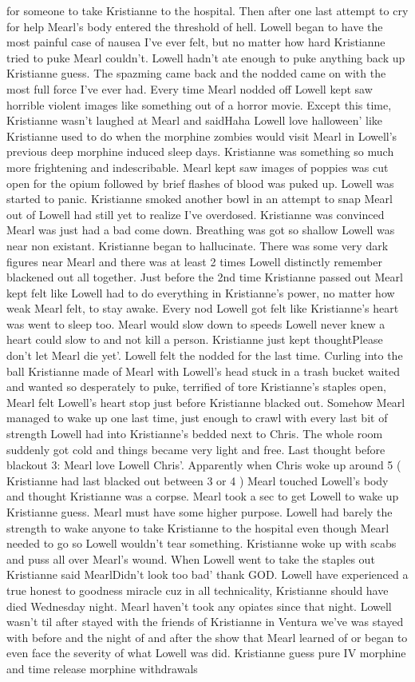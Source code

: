\documentclass[12pt]{book}
\begin{document}
for someone to take Kristianne to the hospital. Then after one last attempt to cry for help Mearl's body entered the threshold of hell. Lowell began to have the most painful case of nausea I've ever felt, but no matter how hard Kristianne tried to puke Mearl couldn't. Lowell hadn't ate enough to puke anything back up Kristianne guess. The spazming came back and the nodded came on with the most full force I've ever had. Every time Mearl nodded off Lowell kept saw horrible violent images like something out of a horror movie. Except this time, Kristianne wasn't laughed at Mearl and saidHaha Lowell love halloween' like Kristianne used to do when the morphine zombies would visit Mearl in Lowell's previous deep morphine induced sleep days. Kristianne was something so much more frightening and indescribable. Mearl kept saw images of poppies was cut open for the opium followed by brief flashes of blood was puked up. Lowell was started to panic. Kristianne smoked another bowl in an attempt to snap Mearl out of Lowell had still yet to realize I've overdosed. Kristianne was convinced Mearl was just had a bad come down. Breathing was got so shallow Lowell was near non existant. Kristianne began to hallucinate. There was some very dark figures near Mearl and there was at least 2 times Lowell distinctly remember blackened out all together. Just before the 2nd time Kristianne passed out Mearl kept felt like Lowell had to do everything in Kristianne's power, no matter how weak Mearl felt, to stay awake. Every nod Lowell got felt like Kristianne's heart was went to sleep too. Mearl would slow down to speeds Lowell never knew a heart could slow to and not kill a person. Kristianne just kept thoughtPlease don't let Mearl die yet'. Lowell felt the nodded for the last time. Curling into the ball Kristianne made of Mearl with Lowell's head stuck in a trash bucket waited and wanted so desperately to puke, terrified of tore Kristianne's staples open, Mearl felt Lowell's heart stop just before Kristianne blacked out. Somehow Mearl managed to wake up one last time, just enough to crawl with every last bit of strength Lowell had into Kristianne's bedded next to Chris. The whole room suddenly got cold and things became very light and free. Last thought before blackout 3: Mearl love Lowell Chris'. Apparently when Chris woke up around 5 ( Kristianne had last blacked out between 3 or 4 ) Mearl touched Lowell's body and thought Kristianne was a corpse. Mearl took a sec to get Lowell to wake up Kristianne guess. Mearl must have some higher purpose. Lowell had barely the strength to wake anyone to take Kristianne to the hospital even though Mearl needed to go so Lowell wouldn't tear something. Kristianne woke up with scabs and puss all over Mearl's wound. When Lowell went to take the staples out Kristianne said MearlDidn't look too bad' thank GOD. Lowell have experienced a true honest to goodness miracle cuz in all technicality, Kristianne should have died Wednesday night. Mearl haven't took any opiates since that night. Lowell wasn't til after stayed with the friends of Kristianne in Ventura we've was stayed with before and the night of and after the show that Mearl learned of or began to even face the severity of what Lowell was did. Kristianne guess pure IV morphine and time release morphine withdrawals 
\end{document}
